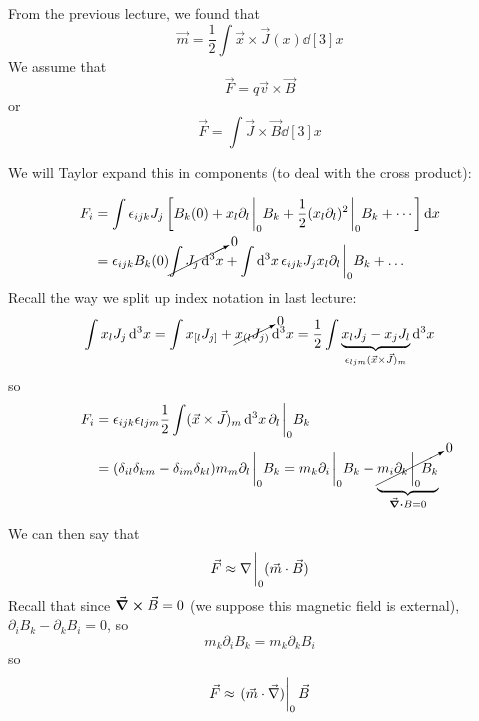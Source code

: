 \documentclass[a4paper,twoside,master.tex]{subfiles}
\begin{document}

From the previous lecture, we found that
\begin{equation}
    \vec{m} = \frac{1}{2} \int \vec{x} \times \vec{J}(x) \dd[3]{x}
\end{equation}
We assume that
\begin{equation}
    \vec{F} = q \vec{v} \times \vec{B}
\end{equation}
or
\begin{equation}
    \vec{F} = \int \vec{J} \times \vec{B} \dd[3]{x}
\end{equation}

We will Taylor expand this in components (to deal with the cross product):

\begin{align}
    F_i &= \int \epsilon_{ijk} J_j \left[ B_k(0) + x_l\partial_l\eval_0 B_k + \frac{1}{2} (x_l\partial_l)^2\eval_0 B_k + \cdots \right] \dd{x}\\
    &= \epsilon_{ijk} B_k(0) \cancelto{0}{\int J_j \dd[3]{x}} + \int \dd[3]{x} \epsilon_{ijk} J_j x_l \partial_l\eval_0 B_k + \ldots
\end{align}
Recall the way we split up index notation in last lecture:
\begin{equation}
    \int x_l J_j \dd[3]{x} = \int x_{[l} J_{j]} + \cancelto{0}{x_{(l}J_{j)}} \dd[3]{x} = \frac{1}{2} \int \underbrace{x_lJ_j-x_jJ_l}_{\epsilon_{ljm} ( \vec{x} \times \vec{J})_m} \dd[3]{x}
\end{equation}
so
\begin{align}
    F_i &= \epsilon_{ijk} \epsilon_{ljm} \frac{1}{2} \int ( \vec{x} \times \vec{J})_m \dd[3]{x} \partial_l\eval_0 B_k\\
    &= (\delta_{il}\delta_{km} - \delta_{im} \delta_{kl})m_m\partial_l\eval_0 B_k = m_k\partial_i\eval_0 B_k - \underbrace{\cancelto{0}{m_i\partial_k\eval_0 B_k}}_{\div{B} = 0}
\end{align}

We can then say that
\begin{equation}
    \vec{F}\approx \nabla\eval_0( \vec{m} \cdot \vec{B} )
\end{equation}
Recall that since $ \curl{ \vec{B}} = 0 $ (we suppose this magnetic field is external), $ \partial_i B_k - \partial_k B_i = 0 $, so
\begin{equation}
    m_k\partial_iB_k = m_k\partial_k B_i
\end{equation}
so
\begin{equation}
    \vec{F}\approx \eval{( \vec{m} \cdot \vec{\nabla} )}_0 \vec{B}
\end{equation}
\end{document}
